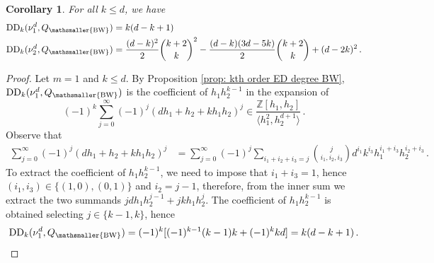 \documentclass[11pt,reqno]{amsart}
\numberwithin{equation}{section}
\theoremstyle{plain}
\numberwithin{theorem}{section}
\newtheorem{corollary}[theorem]{Corollary}
\theoremstyle{definition}
\newcommand{\Z}{\mathbb{Z}}
\newcommand{\DD}{\operatorname{DD}}
\newcommand{\mBW}{\mathsmaller{\mathrm{BW}}}
\begin{document}
\begin{corollary}\label{corol: formulas kth order ED degree small n}
For all $k\le d$, we have
\begin{align*}
    \DD_k(\nu_1^d,Q_\mBW) &= k(d-k+1)\\    
    \DD_k(\nu_2^d,Q_\mBW) &= \frac{(d-k)^2}{2}\binom{k+2}{k}^2-\frac{(d-k)(3d-5k)}{2}\binom{k+2}{k}+(d-2k)^2\,.
\end{align*}
\end{corollary}
\begin{proof}
Let $m=1$ and $k\le d$. By Proposition \ref{prop: kth order ED degree BW}, $\DD_k(\nu_1^d,Q_\mBW)$ is the coefficient of $h_1h_2^{k-1}$ in the expansion of
\begin{equation}
	(-1)^{k}\sum_{j=0}^\infty(-1)^j(dh_1+h_2+kh_1h_2)^j \in \frac{\Z[h_1,h_2]}{\langle h_1^2,h_2^{d+1}\rangle}\,.
\end{equation}
Observe that
\begin{align*}
	\sum_{j=0}^\infty(-1)^j(dh_1+h_2+kh_1h_2)^j &= \sum_{j=0}^\infty(-1)^j\sum_{i_1+i_2+i_3=j}\binom{j}{i_1,i_2,i_3}d^{i_1}k^{i_3}h_1^{i_1+i_3}h_2^{i_2+i_3}\,.
\end{align*}
To extract the coefficient of $h_1h_2^{k-1}$, we need to impose that $i_1+i_3=1$, hence $(i_1,i_3)\in\{(1,0),(0,1)\}$ and
$i_2=j-1$, therefore, from the inner sum we extract the two summands $jdh_1h_2^{j-1}+jkh_1h_2^j$. The coefficient of $h_1h_2^{k-1}$ is obtained selecting $j\in\{k-1,k\}$, hence
\[
\DD_k(\nu_1^d,Q_\mBW) = (-1)^k[(-1)^{k-1}(k-1)k+(-1)^kkd]=k(d-k+1)\,.
\]


\end{proof}
\end{document}

